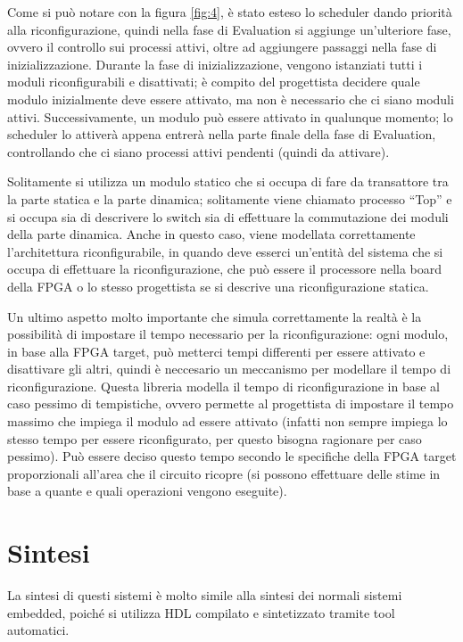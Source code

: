 \documentclass[a4paper,titlepage]{book}
\begin{document}
Come si può notare con la figura \ref{fig:4}, è stato esteso lo scheduler dando priorità alla riconfigurazione, quindi nella fase di Evaluation si aggiunge un'ulteriore fase, ovvero il controllo sui processi attivi, oltre ad aggiungere passaggi nella fase di inizializzazione.
Durante la fase di inizializzazione, vengono istanziati tutti i moduli riconfigurabili e disattivati; è compito del progettista decidere quale modulo inizialmente deve essere attivato, ma non è necessario che ci siano moduli attivi. Successivamente, un modulo può essere attivato in qualunque momento; lo scheduler lo attiverà appena entrerà nella parte finale della fase di Evaluation, controllando che ci siano processi attivi pendenti (quindi da attivare).

Solitamente si utilizza un modulo statico che si occupa di fare da transattore tra la parte statica e la parte dinamica; solitamente viene chiamato processo ``Top'' e si occupa sia di descrivere lo switch sia di effettuare la commutazione dei moduli della parte dinamica. Anche in questo caso, viene modellata correttamente l'architettura riconfigurabile, in quando deve esserci un'entità del sistema che si occupa di effettuare la riconfigurazione, che può essere il processore nella board della FPGA o lo stesso progettista se si descrive una riconfigurazione statica.

Un ultimo aspetto molto importante che simula correttamente la realtà è la possibilità di impostare il tempo necessario per la riconfigurazione: ogni modulo, in base alla FPGA target, può metterci tempi differenti per essere attivato e disattivare gli altri, quindi è neccesario un meccanismo per modellare il tempo di riconfigurazione. Questa libreria modella il tempo di riconfigurazione in base al caso pessimo di tempistiche, ovvero permette al progettista di impostare il tempo massimo che impiega il modulo ad essere attivato (infatti non sempre impiega lo stesso tempo per essere riconfigurato, per questo bisogna ragionare per caso pessimo). Può essere deciso questo tempo secondo le specifiche della FPGA target proporzionali all'area che il circuito ricopre (si possono effettuare delle stime in base a quante e quali operazioni vengono eseguite).


\section{Sintesi}

La sintesi di questi sistemi è molto simile alla sintesi dei normali sistemi embedded, poiché si utilizza HDL compilato e sintetizzato tramite tool automatici.
\end{document}
